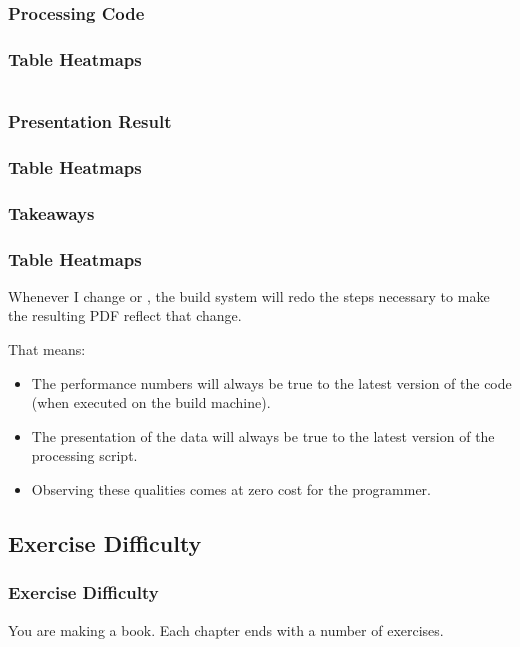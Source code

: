 {\subsubsection{Processing Code}
\begin{frame}[fragile]
  \frametitle{Table Heatmaps }
  \vspace{0mm}
  
  \begin{multicols}{2}
    \inputminted[fontsize=\tiny]{python}{../src/table_heatmap/process.py}
  \end{multicols}
\end{frame}

\subsubsection{Presentation Result}
\begin{frame}[fragile]
  \frametitle{Table Heatmaps }
  \vspace{24mm}
  \scalebox{0.9}{
    
  }
\end{frame}

\subsubsection{Takeaways}
\begin{frame}[fragile]
  \frametitle{Table Heatmaps }
  \vspace{3mm}
  Whenever I change  or , the build system will redo the steps necessary to make the resulting PDF reflect that change.
  
  \vspace{5mm}
  That means:
  \begin{itemize}
    \item The performance numbers will always be true to the latest version of the code (when executed on the build machine).
    \item The presentation of the data will always be true to the latest version of the processing script.
    \item Observing these qualities comes at zero cost for the programmer.
  \end{itemize}
\end{frame}

\subsection{Exercise Difficulty}
\begin{frame}[fragile]
  \frametitle{Exercise Difficulty}
  \vspace{3mm}
  You are making a book. Each chapter ends with a number of exercises.
  

\end{frame}}
